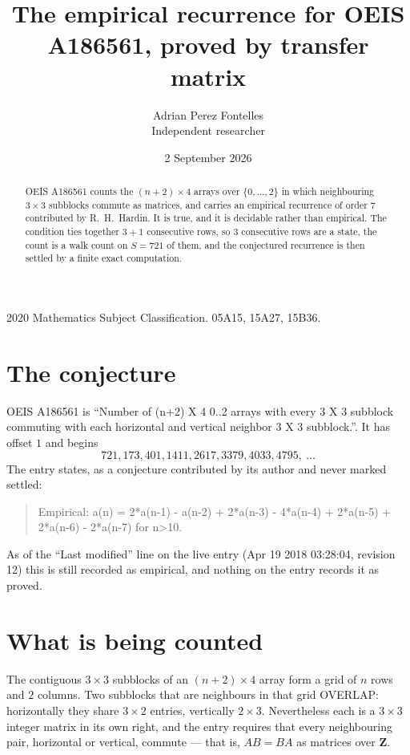 \documentclass[11pt,a4paper]{article}
\title{The empirical recurrence for OEIS A186561, proved by transfer matrix}
\author{Adrian Perez Fontelles\\ \small Independent researcher}
\date{2 September 2026}
\theoremstyle{plain}
\theoremstyle{definition}
\begin{document}
\maketitle

\begin{abstract}
OEIS A186561 counts the $(n+2)\times4$ arrays over $\{0,\dots,2\}$ in which
neighbouring $3\times3$ subblocks commute as matrices, and carries an empirical recurrence
of order $7$ contributed by R.~H.~Hardin. It is true, and it is decidable rather than
empirical. The condition ties together $3+1$ consecutive rows, so $3$ consecutive rows are
a state, the count is a walk count on $S=721$ of them, and the conjectured recurrence is then
settled by a finite exact computation.
\end{abstract}

\noindent\small 2020 Mathematics Subject Classification. 05A15, 15A27, 15B36.\normalsize

\section{The conjecture}

OEIS A186561 is ``Number of (n+2) X 4 0..2 arrays with every 3 X 3 subblock commuting with each horizontal and vertical neighbor 3 X 3 subblock.''. It has offset $1$ and begins
\[
721, 173, 401, 1411, 2617, 3379, 4033, 4795,\ \dots
\]
The entry states, as a conjecture contributed by its author and never marked settled:
\begin{quote}
Empirical: a(n) = 2*a(n-1) - a(n-2) + 2*a(n-3) - 4*a(n-4) + 2*a(n-5) + 2*a(n-6) - 2*a(n-7) for n>10.
\end{quote}
As of the ``Last modified'' line on the live entry (Apr 19 2018 03:28:04, revision 12) this is still
recorded as empirical, and nothing on the entry records it as proved.

\section{What is being counted}

The contiguous $3\times3$ subblocks of an $(n+2)\times4$ array form a grid of $n$
rows and $2$ columns. Two subblocks that are neighbours in that
grid OVERLAP: horizontally they share $3\times2$ entries, vertically
$2\times3$. Nevertheless each is a $3\times3$ integer matrix in its own right, and
the entry requires that every neighbouring pair, horizontal or vertical, commute --- that is,
$AB=BA$ as matrices over $\mathbf{Z}$.
\end{document}
